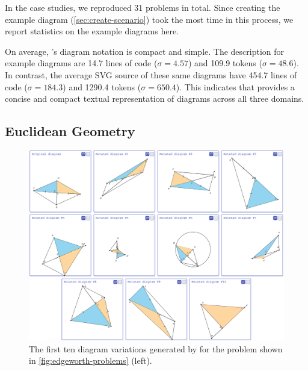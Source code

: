 In the case studies, we reproduced 31 problems in total. Since creating the example diagram (\cref{sec:create-scenario}) took the most time in this process, we report statistics on the example diagrams here. 

On average, \Edgeworth's diagram notation is compact and simple. The description for example diagrams are 14.7 lines of code ($\sigma = 4.57$) and 109.9 tokens ($\sigma = 48.6$). In contrast, the average SVG source of these same diagrams have 454.7 lines of code ($\sigma = 184.3$) and 1290.4 tokens ($\sigma = 650.4$). This indicates that \Edgeworth provides a concise and compact textual representation of diagrams across all three domains.

\subsection{Euclidean Geometry}
\label{sec:edgeworth-geometry}

\begin{figure}[h]
    \centering
    \includegraphics[width=\linewidth]{assets/chapter-3/geometry-grid.png}
    \caption{\textmd{The first ten diagram variations generated by \Edgeworth for the problem shown in \cref{fig:edgeworth-problems} (left).}}
    \label{fig:geometry-grid}
\end{figure}

